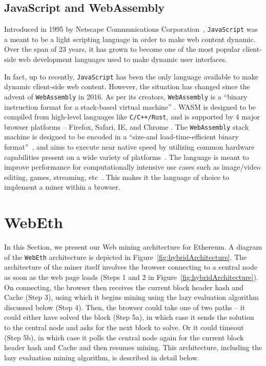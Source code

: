\documentclass[runningheads]{llncs}
\begin{document}
\subsection{JavaScript and WebAssembly}
Introduced in 1995 by Netscape Communications Corporation~\cite{js}, \verb|JavaScript| was a meant to be a light scripting language in order to  make web content dynamic. Over the span of 23 years, it has grown to become one of the most popular client-side web development languages used to make dynamic user interfaces. 

In fact, up to recently, \verb|JavaScript| has been the only language available to make dynamic client-side web content. However, the situation has changed since the advent of \verb|WebAssembly| in 2016. As per its creators, \verb|WebAssembly| is a ``binary instruction format for a stack-based virtual machine'' \cite{webAssembly}. WASM is designed to be compiled from high-level languages like \verb|C/C++/Rust|, and is supported by 4 major browser platforms -- Firefox, Safari, IE, and Chrome \cite{webAssembly}. The \verb|WebAssembly| stack machine is designed to be encoded in a ``size-and load-time-efficient binary format''~\cite{webAssembly}, and aims to execute near native speed by utilizing common hardware capabilities present on a wide variety of platforms~\cite{webAssembly}. The language is meant to improve performance for computationally intensive use cases such as image/video editing, games, streaming, etc~\cite{webAssembly}. This makes it the language of choice to implement a miner within a browser. 

\section{WebEth}
\label{sec:webeth}
In this Section, we present our Web mining architecture for Ethereum. A diagram of the \verb|WebEth| architecture is depicted in Figure~\ref{fig:hybridArchitecture}. The architecture of the miner itself involves the browser connecting to a central node as soon as the web page loads (Steps 1 and 2 in Figure~\ref{fig:hybridArchitecture}). On connecting, the browser then receives the current block header hash and Cache (Step 3), using which it begins mining using the lazy evaluation algorithm discussed below (Step 4). Then, the browser could take one of two paths -- it could either have solved the block (Step 5a), in which case it sends the solution to the central node and asks for the next block to solve. Or it could timeout (Step 5b), in which case it polls the central node again for the current block header hash and Cache and then resumes mining. This architecture, including the lazy evaluation mining algorithm, is described in detail below.
\end{document}
